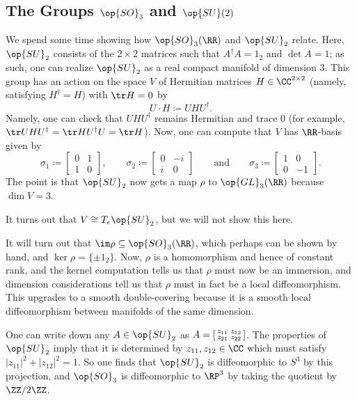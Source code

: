 \documentclass[../notes.tex]{subfiles}
\begin{document}
\subsection{The Groups \texorpdfstring{$\op{SO}_3$}{SO3} and \texorpdfstring{$\op{SU}(2)$}{SU2}}
We spend some time showing how $\op{SO}_3(\RR)$ and $\op{SU}_2$ relate. Here, $\op{SU}_2$ consists of the $2\times2$ matrices such that $A^\dagger A=1_2$ and $\det A=1$; as such, one can realize $\op{SU}_2$ as a real compact manifold of dimension $3$. This group has an action on the space $V$ of Hermitian matrices $H\in\CC^{2\times2}$ (namely, satisfying $H^\dagger=H$) with $\tr H=0$ by
\[U\cdot H\coloneqq UHU^\dagger.\]
Namely, one can check that $UHU^\dagger$ remains Hermitian and trace $0$ (for example, $\tr UHU^\dagger=\tr HU^\dagger U=\tr H$). Now, one can compute that $V$ has $\RR$-basis given by
\[\sigma_1\coloneqq\begin{bmatrix}
	0 & 1 \\
	1 & 0
\end{bmatrix},\qquad\sigma_2\coloneqq\begin{bmatrix}
	0 & -i \\
	i & 0
\end{bmatrix}\qquad\text{and}\qquad\sigma_3\coloneqq\begin{bmatrix}
	1 & 0 \\
	0 & -1
\end{bmatrix}.\]
The point is that $\op{SU}_2$ now gets a map $\rho$ to $\op{GL}_3(\RR)$ because $\dim V=3$.
\begin{remark}
	It turns out that $V\cong T_e\op{SU}_2$, but we will not show this here.
\end{remark}
It will turn out that $\im\rho\subseteq\op{SO}_3(\RR)$, which perhaps can be shown by hand, and $\ker\rho=\{\pm1_2\}$. Now, $\rho$ is a homomorphism and hence of constant rank, and the kernel computation tells us that $\rho$ must now be an immersion, and dimension considerations tell us that $\rho$ must in fact be a local diffeomorphism. This upgrades to a smooth double-covering because it is a smooth local diffeomorphism between manifolds of the same dimension.
\begin{remark}
	One can write down any $A\in\op{SU}_2$ as $A=\begin{bsmallmatrix}
		z_{11} & z_{12} \\
		z_{21} & z_{22}
	\end{bsmallmatrix}$. The properties of $\op{SU}_2$ imply that it is determined by $z_{11},z_{12}\in\CC$ which must satisfy $\left|z_{11}\right|^2+\left|z_{12}\right|^2=1$. So one finds that $\op{SU}_2$ is diffeomorphic to $S^3$ by this projection, and $\op{SO}_3$ is diffeomorphic to $\RP^3$ by taking the quotient by $\ZZ/2\ZZ$.
\end{remark}
\end{document}
